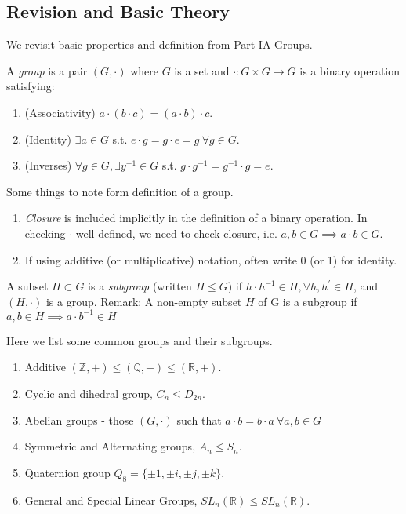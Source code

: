 \subsection{Revision and Basic Theory}
We revisit basic properties and definition from Part IA Groups.
\begin{definition}[Group]
    A \textit{group} is a pair \((G, \cdot)\) where \(G\) is a set and \(\cdot: G \times G \to G\) is a binary operation satisfying:
    \begin{enumerate}
        \item (Associativity) \(a \cdot (b \cdot c) = (a \cdot b) \cdot c \).
        \item (Identity) \(\exists a \in G\) s.t. \(e\cdot g = g \cdot e = g~\forall g \in G\).
        \item (Inverses) \(\forall g \in G, \exists y^{-1}\in G \) s.t. \( g\cdot g^{-1} = g^{-1}\cdot g = e\).
    \end{enumerate}
\end{definition}
\begin{remark}
    Some things to note form definition of a group.
    \begin{enumerate}
        \item \textit{Closure} is included implicitly in the definition of a binary operation. In checking \(\cdot\) well-defined, we need to check closure, i.e. \(a,b \in G \implies a\cdot b \in G\).
        \item If using additive (or multiplicative) notation, often write 0 (or 1) for identity.
    \end{enumerate}
\end{remark}

\begin{definition}[Subgroup]
A subset \(H \subset G\) is a \textit{subgroup} (written \(H \leq G\)) if \(h\cdot h^{-1}\in H, \forall h,h^\prime \in H\), and \((H, \cdot)\) is a group.
Remark: A non-empty subset \(H\) of G is a subgroup if \(a, b \in H \implies a\cdot b^{-1}\in H\) 
\end{definition}

\begin{eg}
    Here we list some common groups and their subgroups.
    \begin{enumerate}
        \item Additive \((\mathbb{Z},+) \leq (\mathbb{Q},+) \leq (\mathbb{R},+)\).
        \item Cyclic and dihedral group, \(C_n \leq  D_{2n}\).
        \item Abelian groups - those \((G, \cdot)\) such that \(a \cdot b = b \cdot a~\forall a, b \in G\) 
        \item Symmetric and Alternating groups, \(A_n \leq  S_n\).
        \item Quaternion group \(Q_8 = \{\pm 1, \pm i, \pm j, \pm k\}\).
        \item General and Special Linear Groups, \(SL_n(\mathbb{R}) \leq  SL_n(\mathbb{R})\).
    \end{enumerate}
\end{eg}

